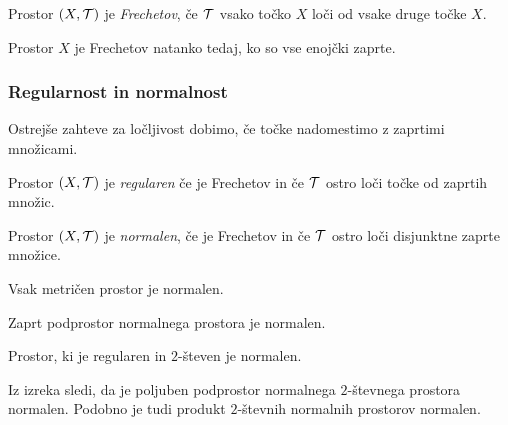 \begin{definicija}
    Prostor $(X, \mathcal{T})$ je \emph{Frechetov}, če $\mathcal{T}$ vsako točko $X$ loči od vsake druge točke $X$.
\end{definicija}

\begin{trditev}
    Prostor $X$ je Frechetov natanko tedaj, ko so vse enojčki zaprte.
\end{trditev}

\subsubsection{Regularnost in normalnost}
Ostrejše zahteve za ločljivost dobimo, če točke nadomestimo z zaprtimi množicami.
\begin{definicija}
    Prostor $(X, \mathcal{T})$ je \emph{regularen} če je Frechetov in če $\mathcal{T}$ ostro loči točke od zaprtih množic.
\end{definicija}

\begin{definicija}
    Prostor $(X, \mathcal{T})$ je \emph{normalen}, če je Frechetov in če $\mathcal{T}$ ostro loči disjunktne zaprte množice.
\end{definicija}

\begin{trditev}
    Vsak metričen prostor je normalen.
\end{trditev}

\begin{trditev}
    Zaprt podprostor normalnega prostora je normalen. 
\end{trditev}

\begin{izrek}
    Prostor, ki je regularen in $2$-števen je normalen.
\end{izrek}

\begin{opomba}
    Iz izreka sledi, da je poljuben podprostor normalnega $2$-števnega prostora normalen. Podobno je tudi produkt $2$-števnih normalnih prostorov normalen.
\end{opomba}

